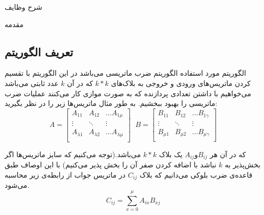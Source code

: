 \documentclass[]{article}
\begin{document}
	
\begin{titlepage}
\begin{center}
\heading
\end{center}
\end{titlepage}


\newpage
\pageheader
\tableofcontents

\newpage

 \Large \textbf{}
\begin{section-container}{شرح وظایف}
\end{section-container}


\pagebreak



\begin{section-container}{مقدمه}
	
	\subsection{تعریف الگوریتم}
	الگوریتم مورد استفاده الگوریتم ضرب ماتریسی  می‌باشد در این الگوریتم با تقسیم کردن ماتریس‌های ورودی و خروجی به بلاک‌های $k*k$ که در آن $k$ عدد ثابتی می‌باشد می‌خواهیم با داشتن تعدادی پردازنده‌ که به صورت موازی کار می‌کنند عملیات ضرب ماتریسی را بهبود ببخشیم. به طور مثال ماتریس‌ها زیر را در نظر بگیرید:
	\begin{equation}
	A = \begin{bmatrix}
	A_{11}& A_{12}& \dots A_{1\mu}\\
	\vdots& \ddots& \vdots\\
	A_{\lambda1}& A_{\lambda2}& \dots A_{\lambda\mu}\\
	\end{bmatrix} 
	\ \ \, 
	B = \begin{bmatrix}
	B_{11}& B_{12}& \dots B_{1\gamma}\\
	\vdots& \ddots& \vdots\\
	B_{\mu1}& B_{\mu2}& \dots B_{\mu\gamma}\\
	\end{bmatrix} 
	\end{equation}
	
	که در آن هر $A_{ij} و B_{ij}$ یک بلاک $k*k$ می‌باشد.(توجه می‌کنیم که  سایز‌ ماتریس‌ها اگر بخش‌‌پذیر به $k$ نباشد با اضافه‌ کردن صفر آن را بخش پذیر می‌کنیم) با این اوصاف طبق قاعده‌ی ضرب بلوکی می‌دانیم که بلاک $C_{ij}$ در ماتریس جواب از رابطه‌ی زیر محاسبه می‌شود.
	\begin{equation}
	C_{ij} = \sum_{x=0}^\mu A_{ix}B_{xj}
	\label{1}
	\end{equation}
	

\end{section-container}
\end{document}
